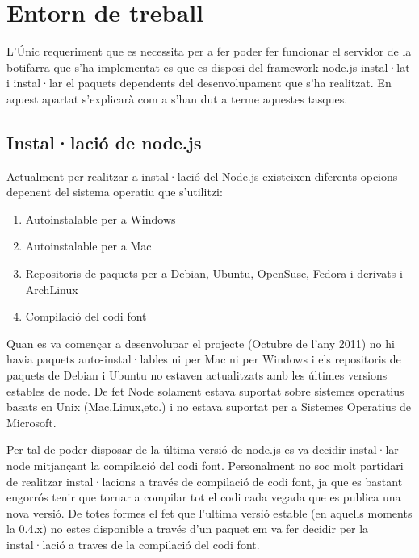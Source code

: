 \chapter{Entorn de treball}

L'Únic requeriment que es necessita per a fer poder fer funcionar el servidor de la botifarra que s'ha implementat es que es disposi del framework node.js instal·lat i instal·lar el paquets dependents del desenvolupament que s'ha realitzat. En aquest apartat s'explicarà com a s'han dut a terme aquestes tasques. 

\section{Instal·lació de node.js}

Actualment per realitzar a instal·lació del Node.js existeixen diferents opcions depenent del sistema operatiu que s'utilitzi: 

\begin{enumerate}
    \item{Autoinstalable per a Windows}
    \item{Autoinstalable per a Mac}
    \item{Repositoris de paquets per a Debian, Ubuntu, OpenSuse, Fedora i derivats i ArchLinux}
    \item{Compilació del codi font}
\end{enumerate}

Quan es va començar a desenvolupar el projecte (Octubre de l'any 2011) no hi havia paquets auto-instal·lables ni per Mac ni per Windows i els repositoris de paquets de Debian i Ubuntu no estaven actualitzats amb les últimes versions estables de node. De fet Node solament estava suportat sobre sistemes operatius basats en Unix (Mac,Linux,etc.) i no estava suportat per a Sistemes Operatius de Microsoft. 

Per tal de poder disposar de la última versió de node.js es va decidir instal·lar node mitjançant la compilació del codi font. Personalment no soc molt partidari de realitzar instal·lacions a través de compilació de codi font, ja que es bastant engorrós tenir que tornar a compilar tot el codi cada vegada que es publica una nova versió. De totes formes el fet que l'ultima versió estable (en aquells moments la 0.4.x) no estes disponible a través d'un paquet em va fer decidir per la instal·lació a traves de la compilació del codi font. 

